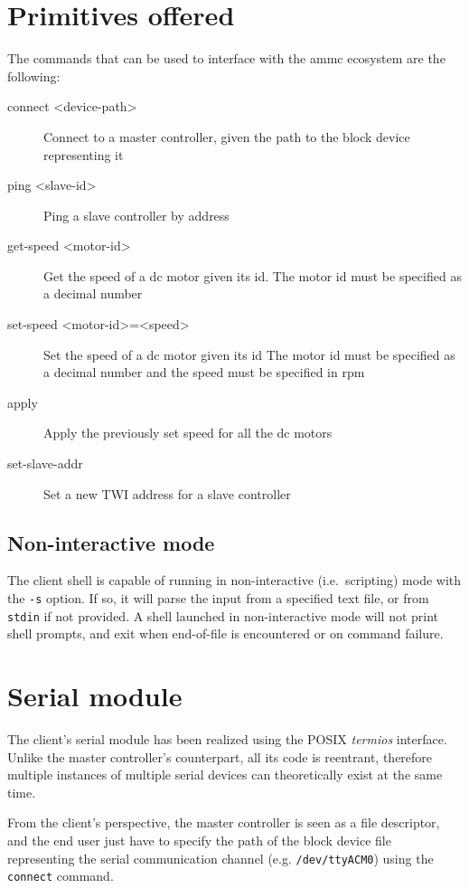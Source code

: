 \section{Primitives offered}
The commands that can be used to interface with the ammc ecosystem are the
following:
\begin{description}
  \item[connect <device-path>] Connect to a master controller, given the path
    to the block device representing it
  \item[ping <slave-id>] Ping a slave controller by address
  \item[get-speed <motor-id>] Get the speed of a dc motor given its id.
    The motor id must be specified as a decimal number
  \item[set-speed <motor-id>=<speed>] Set the speed of a dc motor given its id
    The motor id must be specified as a decimal number and the speed must be
    specified in rpm
  \item[apply] Apply the previously set speed for all the dc motors
  \item[set-slave-addr] Set a new TWI address for a slave controller
\end{description}

\subsection{Non-interactive mode}
The client shell is capable of running in non-interactive (i.e.\ scripting)
mode with the \texttt{-s} option.  If so, it will parse the input from a
specified text file, or from \texttt{stdin} if not provided.  A shell launched
in non-interactive mode will not print shell prompts, and exit when end-of-file
is encountered or on command failure.

\section{Serial module}
The client's serial module has been realized using the POSIX \emph{termios}
interface. Unlike the master controller's counterpart, all its code is
reentrant, therefore multiple instances of multiple serial devices can
theoretically exist at the same time.

From the client's perspective, the master controller is seen as a file
descriptor, and the end user just have to specify the path of the block device
file representing the serial communication channel (e.g. \texttt{/dev/ttyACM0})
using the \texttt{connect} command.

